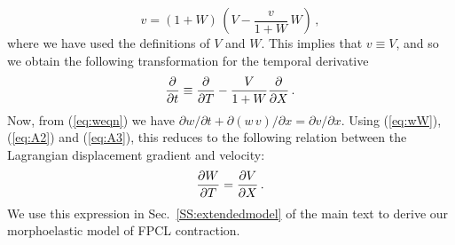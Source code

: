 \begin{equation*}
v = (1+W)\,\left( V-\frac{v}{1+W}\,W \right)\,,
\end{equation*}
where we have used the definitions of $V$ and $W$. This implies that $v\equiv V$, and so we obtain the following transformation for the temporal derivative
\begin{equation}
\frac{\partial }{\partial t}\equiv\frac{\partial }{\partial T}-\frac{V}{1+W}\frac{\partial }{\partial X}\,.
\label{eq:A3}
\end{equation}
Now, from (\ref{eq:weqn}) we have $\partial{w}/\partial{t} + \partial{(w\,v)}/\partial{x} = \partial{v}/\partial{x}$. Using (\ref{eq:wW}), (\ref{eq:A2}) and (\ref{eq:A3}), this reduces to the following relation between the Lagrangian displacement gradient and velocity:
\begin{equation}
\label{eq:WV}
\frac{\partial W}{\partial T}=\frac{\partial V}{\partial X}\,.
\end{equation}
We use this expression in Sec.~\ref{SS:extendedmodel} of the main text to derive our morphoelastic model of FPCL contraction.



